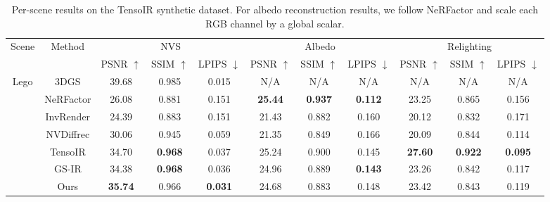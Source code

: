 \documentclass{article} %
\begin{document}
\begin{table}[!thp]
    \small 
    \centering
    \setlength{\tabcolsep}{1mm}{}
    \renewcommand{\arraystretch}{1}
    \caption{Per-scene results on the TensoIR synthetic dataset. For albedo reconstruction results, we follow NeRFactor \citep{zhang2021nerfactor} and scale each RGB channel by a global scalar.}
    \label{tab:tenso}
    \begin{tabular}{cc|ccc|ccc|ccc}
         \hline 
         \multirow{2}{*}{ Scene } & \multirow{2}{*}{Method} &\multicolumn{3}{c}{NVS }  & \multicolumn{3}{c}{  Albedo } & \multicolumn{3}{c}{ Relighting } \\
          & & PSNR $\uparrow$ & SSIM $\uparrow$ & LPIPS $\downarrow$ & PSNR $\uparrow$ & SSIM $\uparrow$ & LPIPS $\downarrow$ & PSNR $\uparrow$ & SSIM $\uparrow$ & LPIPS $\downarrow$\\
        \hline \multirow{7}{*}{Lego} & 3DGS & 39.68 & 0.985 & 0.015 & N/A & N/A&  N/A& N/A & N/A &  N/A \\
        & NeRFactor & 26.08 & 0.881 & 0.151 & \cellcolor{a}\textbf{25.44} &\cellcolor{a}\textbf{0.937} & \cellcolor{a}\textbf{0.112} & 23.25 &\cellcolor{b} 0.865 & 0.156 \\
         &InvRender & 24.39 &0.883 & 0.151 & 21.43 & 0.882 & 0.160 & 20.12 & 0.832 & 0.171 \\
         &NVDiffrec & 30.06 & \cellcolor{c}0.945 & 0.059 & 21.35 & 0.849 & 0.166 & 20.09 & \cellcolor{b}0.844 &\cellcolor{b} 0.114 \\
         &TensoIR & \cellcolor{b}34.70 & \cellcolor{a}\textbf{0.968} & \cellcolor{c}0.037 & \cellcolor{b}25.24 &\cellcolor{b} 0.900 & \cellcolor{c}0.145 & \cellcolor{a}\textbf{27.60} &\cellcolor{a} \textbf{0.922} & \cellcolor{a}\textbf{0.095} \\
         &GS-IR & \cellcolor{c}34.38 & \cellcolor{a}\textbf{0.968} & \cellcolor{b}0.036 & \cellcolor{c}24.96 &\cellcolor{b}0.889 & \cellcolor{b}\textbf{0.143} &\cellcolor{c} 23.26 & 0.842 & \cellcolor{c}0.117 \\
         &Ours & \cellcolor{a}\textbf{35.74} & \cellcolor{b}0.966 & \cellcolor{a}\textbf{0.031} & 24.68 &0.883 & 0.148 & \cellcolor{b}23.42 & 0.843 &0.119 \\
         

\end{tabular}
\end{table}
\end{document}
